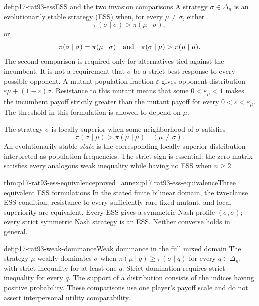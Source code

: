 \begin{hbdefinition}{def:p17-rat93-ess}{ESS and the two invasion comparisons}
A strategy \(\sigma\in\Delta_n\) is an evolutionarily stable
strategy (ESS) when, for every \(\mu\ne\sigma\), either
\[
 \pi(\sigma\mid\sigma)>\pi(\mu\mid\sigma),
\]
or
\[
 \pi(\sigma\mid\sigma)=\pi(\mu\mid\sigma)
 \quad\hbox{and}\quad
 \pi(\sigma\mid\mu)>\pi(\mu\mid\mu).
\]
The second comparison is required only for alternatives tied against the
incumbent. It is not a requirement that \(\sigma\) be a strict best
response to every possible opponent. A mutant population fraction
\(\varepsilon\) gives opponent distribution
\(\varepsilon\mu+(1-\varepsilon)\sigma\). Resistance to this mutant
means that some \(0<\varepsilon_\mu<1\) makes the incumbent payoff
strictly greater than the mutant payoff for every
\(0<\varepsilon<\varepsilon_\mu\). The threshold in this formulation
is allowed to depend on \(\mu\).

The strategy \(\sigma\) is locally superior when some neighborhood
of \(\sigma\) satisfies
\[
        \pi(\sigma\mid\mu)>\pi(\mu\mid\mu)
        \quad(\mu\ne\sigma).
\]
An evolutionarily stable \emph{state} is the corresponding locally
superior distribution interpreted as population frequencies. The strict
sign is essential: the zero matrix satisfies every analogous weak
inequality while having no ESS when \(n\geq2\).
\end{hbdefinition}

\begin{hbtheorem}{thm:p17-rat93-ess-equivalence}{proved=annex:p17.rat93-ess-equivalence}{Three equivalent ESS formulations}
In the stated finite bilinear domain, the two-clause ESS condition,
resistance to every sufficiently rare fixed mutant, and local superiority
are equivalent. Every ESS gives a symmetric Nash profile
\((\sigma,\sigma)\); every strict symmetric Nash strategy is an ESS.
Neither converse holds in general.
\end{hbtheorem}

\begin{hbdefinition}{def:p17-rat93-weak-dominance}{Weak dominance in the full mixed domain}
The strategy \(\mu\) weakly dominates \(\sigma\) when
\(\pi(\mu\mid q)\geq\pi(\sigma\mid q)\) for every
\(q\in\Delta_n\), with strict inequality for at least one \(q\).
Strict domination requires strict inequality for every \(q\).
The support of a distribution consists of the indices having positive
probability. These comparisons use one player's payoff scale and do not
assert interpersonal utility comparability.
\end{hbdefinition}


